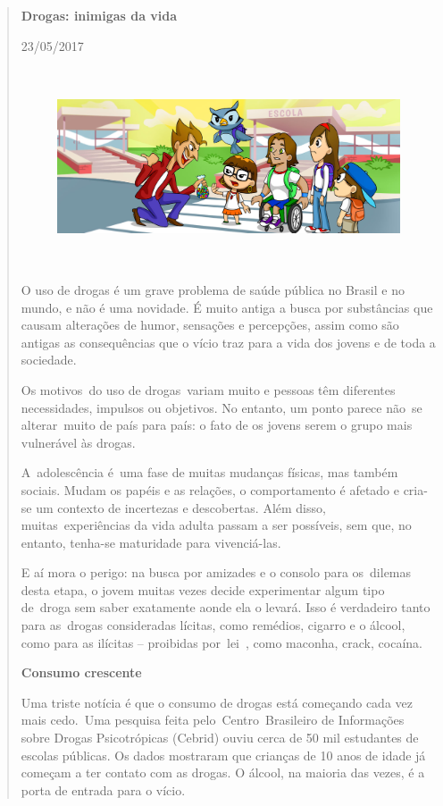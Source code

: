 \begin{quote}
\textbf{Drogas: inimigas da vida}

23/05/2017

\begin{figure}
\centering
\includegraphics[width=5.90556in,height=2.30417in]{./_SAEB_9_POR/media/image17.jpeg}
\caption{}
\end{figure}

O uso de drogas é um grave problema de saúde pública no Brasil e no
mundo, e não é uma novidade. É muito antiga a busca por substâncias que
causam alterações de humor, sensações e percepções, assim como são
antigas as consequências que o vício traz para a vida dos jovens e de
toda a sociedade.

Os motivos~do uso de drogas~variam muito e pessoas têm diferentes
necessidades, impulsos ou objetivos. No entanto, um ponto parece não~se
alterar~muito de país para país: o fato de os jovens serem o grupo mais
vulnerável às drogas.

A~adolescência é~uma fase de muitas mudanças físicas, mas também
sociais. Mudam os papéis e as relações, o comportamento é afetado e
cria-se um contexto de incertezas e descobertas. Além disso,
muitas~experiências da vida adulta passam a ser possíveis, sem que, no
entanto, tenha-se maturidade para vivenciá-las.

E aí mora o perigo: na busca por amizades e o consolo para os~dilemas
desta etapa, o jovem muitas vezes decide experimentar algum tipo
de~droga sem saber exatamente aonde ela o levará. Isso é verdadeiro
tanto para as~drogas consideradas lícitas, como remédios, cigarro e o
álcool, como para as ilícitas -- proibidas por~lei~, como maconha,
crack, cocaína.

\textbf{Consumo crescente}

Uma triste notícia é que o consumo de drogas está começando cada vez
mais cedo.~Uma pesquisa feita pelo~Centro~Brasileiro de Informações
sobre Drogas Psicotrópicas (Cebrid) ouviu cerca de 50 mil estudantes de
escolas públicas. Os dados mostraram que crianças de 10 anos de idade já
começam a ter contato com as drogas. O álcool, na maioria das vezes, é a
porta de entrada para o vício.


\end{quote}
